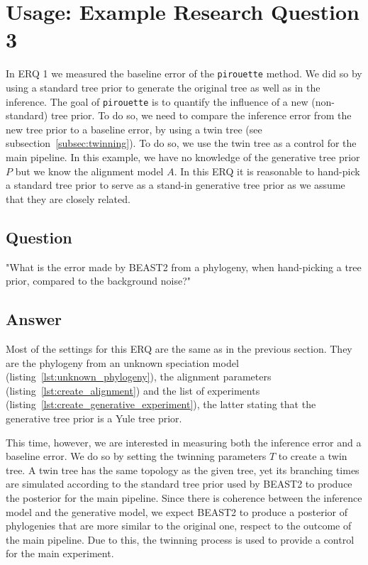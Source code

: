 \documentclass{article}
\begin{document}
\section{Usage: Example Research Question 3}

In ERQ 1 we measured the baseline error of the \verb;pirouette; method. We did so by using a standard tree prior to generate the original tree as well as in the inference.
The goal of \verb;pirouette; is to quantify the 
influence of a new (non-standard) tree prior.
To do so, we need to compare the inference error 
from the new tree prior to a baseline error,
by using a twin tree (see subsection~\ref{subsec:twinning}).
To do so, we use the twin tree as a control for the main pipeline.
In this example, we have no knowledge of the generative tree prior $\mathit{P}$
but we know the alignment model $\mathit{A}$.
In this ERQ it is reasonable to hand-pick a standard tree prior 
to serve as a stand-in generative tree prior as we assume that they are closely related.

\subsection{Question}

"What is the error made by BEAST2 from a phylogeny, 
when hand-picking a tree prior, compared to the background noise?"

\subsection{Answer}

Most of the settings for this ERQ are
the same as in the previous section. They are
the phylogeny from an unknown speciation model 
(listing~\ref{lst:unknown_phylogeny}), 
the alignment parameters (listing~\ref{lst:create_alignment})
and the list of experiments (listing~\ref{lst:create_generative_experiment}),
the latter stating that the generative tree prior is a Yule tree prior.

This time, however, we are interested in measuring both the inference error
and a baseline error. We do so by setting the twinning parameters $\mathit{T}$ to create a twin tree. A twin tree
has the same topology as the given tree, yet its branching times are simulated 
according to the standard tree prior used by BEAST2 to produce the posterior 
for the main pipeline. 
Since there is coherence between the inference model and the generative model, 
we expect BEAST2 to produce a posterior of phylogenies that are more similar to the 
original one, respect to the outcome of the main pipeline. 
Due to this, the twinning process is used to provide a control for the main 
experiment.
\end{document}
